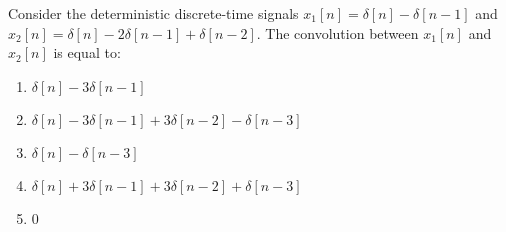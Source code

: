 \begin{q}{}
Consider the deterministic discrete-time signals $x_{1}[n] = \delta[n] - \delta[n-1]$ and $x_{2}[n] = \delta[n] - 2\delta[n-1] + \delta[n-2]$. The convolution between $x_{1}[n]$ and $x_{2}[n]$ is equal to:

\begin{enumerate}[label=(\alph*)]
    \item $\delta[n] - 3\delta[n-1]$
    \item $\delta[n] - 3\delta[n-1] + 3\delta[n-2] - \delta[n-3]$
    \item $\delta[n] - \delta[n-3]$
    \item $\delta[n] + 3\delta[n-1] + 3\delta[n-2] + \delta[n-3]$
    \item 0
\end{enumerate}
\end{q}

